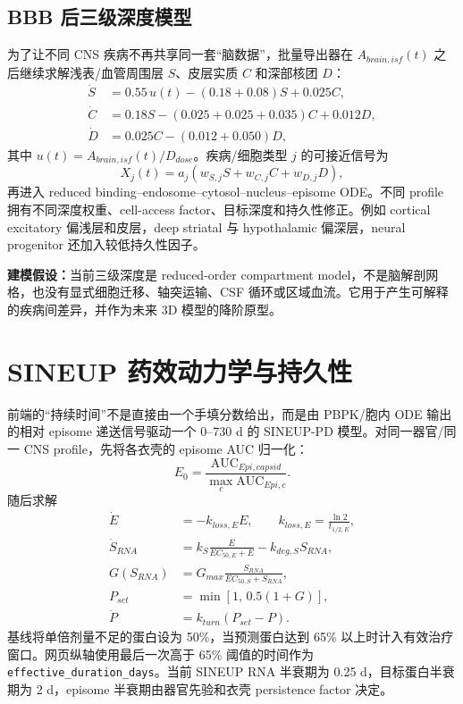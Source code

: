\documentclass[UTF8,11pt,a4paper]{ctexart}
\newcommand{\AUC}{\mathrm{AUC}}
\newcommand{\code}[1]{\texttt{#1}}
\newcommand{\assumption}[1]{\textcolor{warning}{\textbf{建模假设：}#1}}
\begin{document}
\subsection{BBB 后三级深度模型}
为了让不同 CNS 疾病不再共享同一套“脑数据”，批量导出器在 $A_{brain,isf}(t)$ 之后继续求解浅表/血管周围层 $S$、皮层实质 $C$ 和深部核团 $D$：
\begin{align}
\dot S &=0.55\,u(t)-(0.18+0.08)S+0.025C,\\
\dot C &=0.18S-(0.025+0.025+0.035)C+0.012D,\\
\dot D &=0.025C-(0.012+0.050)D,
\end{align}
其中 $u(t)=A_{brain,isf}(t)/D_{dose}$。疾病/细胞类型 $j$ 的可接近信号为
\begin{equation}
X_j(t)=a_j\left(w_{S,j}S+w_{C,j}C+w_{D,j}D\right),
\end{equation}
再进入 reduced binding--endosome--cytosol--nucleus--episome ODE。不同 profile 拥有不同深度权重、cell-access factor、目标深度和持久性修正。例如 cortical excitatory 偏浅层和皮层，deep striatal 与 hypothalamic 偏深层，neural progenitor 还加入较低持久性因子。

\assumption{当前三级深度是 reduced-order compartment model，不是脑解剖网格，也没有显式细胞迁移、轴突运输、CSF 循环或区域血流。它用于产生可解释的疾病间差异，并作为未来 3D 模型的降阶原型。}

\section{SINEUP 药效动力学与持久性}

前端的“持续时间”不是直接由一个手填分数给出，而是由 PBPK/胞内 ODE 输出的相对 episome 递送信号驱动一个 0--730 d 的 SINEUP-PD 模型。对同一器官/同一 CNS profile，先将各衣壳的 episome AUC 归一化：
\begin{equation}
E_0=\frac{\AUC_{Epi,capsid}}{\max_c\AUC_{Epi,c}}.
\end{equation}
随后求解
\begin{align}
\dot E &=-k_{loss,E}E,\qquad k_{loss,E}=\frac{\ln2}{t_{1/2,E}},\\
\dot S_{RNA}&=k_{S}\frac{E}{EC_{50,E}+E}-k_{deg,S}S_{RNA},\\
G(S_{RNA})&=G_{max}\frac{S_{RNA}}{EC_{50,S}+S_{RNA}},\\
P_{set}&=\min\left[1,\,0.5(1+G)\right],\\
\dot P&=k_{turn}(P_{set}-P).
\end{align}
基线将单倍剂量不足的蛋白设为 50\%，当预测蛋白达到 65\% 以上时计入有效治疗窗口。网页纵轴使用最后一次高于 65\% 阈值的时间作为 \code{effective\_duration\_days}。当前 SINEUP RNA 半衰期为 0.25 d，目标蛋白半衰期为 2 d，episome 半衰期由器官先验和衣壳 persistence factor 决定。
\end{document}
